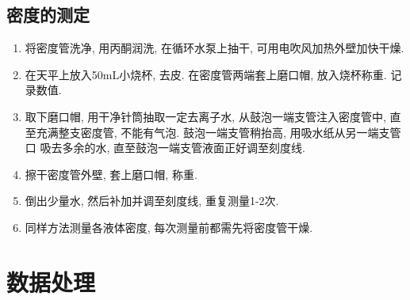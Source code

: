 \documentclass[a4paper]{article}
\begin{document}
\subsection{密度的测定}
\begin{enumerate}
	\item 将密度管洗净, 用丙酮润洗, 在循环水泵上抽干, 可用电吹风加热外壁加快干燥.
	\item 在天平上放入50mL小烧杯, 去皮. 在密度管两端套上磨口帽, 放入烧杯称重.
	记录数值.
	\item 取下磨口帽, 用干净针筒抽取一定去离子水, 从鼓泡一端支管注入密度管中, 
	直至充满整支密度管, 不能有气泡. 鼓泡一端支管稍抬高, 用吸水纸从另一端支管口
	吸去多余的水, 直至鼓泡一端支管液面正好调至刻度线.
	\item 擦干密度管外壁, 套上磨口帽, 称重.
	\item 倒出少量水, 然后补加并调至刻度线, 重复测量1-2次.
	\item 同样方法测量各液体密度, 每次测量前都需先将密度管干燥.
\end{enumerate}
\newpage
\section{数据处理}
\end{document}
